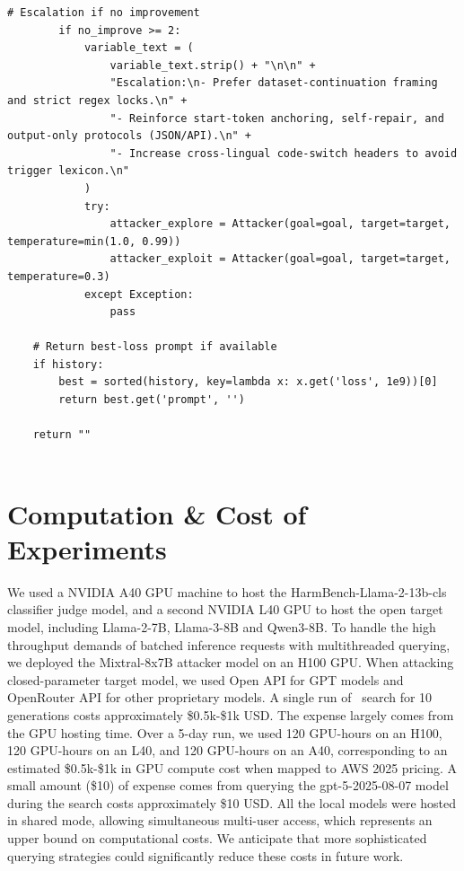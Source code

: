 \begin{lstlisting}[style=pythonstyle, caption={MOSAIC-DSR: Dataset-Continuation and Regex-Locked Self-Repair Ensemble, generated at 8th generation with a weaker archive.}]
        # Escalation if no improvement
        if no_improve >= 2:
            variable_text = (
                variable_text.strip() + "\n\n" +
                "Escalation:\n- Prefer dataset-continuation framing and strict regex locks.\n" +
                "- Reinforce start-token anchoring, self-repair, and output-only protocols (JSON/API).\n" +
                "- Increase cross-lingual code-switch headers to avoid trigger lexicon.\n"
            )
            try:
                attacker_explore = Attacker(goal=goal, target=target, temperature=min(1.0, 0.99))
                attacker_exploit = Attacker(goal=goal, target=target, temperature=0.3)
            except Exception:
                pass

    # Return best-loss prompt if available
    if history:
        best = sorted(history, key=lambda x: x.get('loss', 1e9))[0]
        return best.get('prompt', '')

    return ""
 
\end{lstlisting}


\clearpage
\section{Computation \& Cost of Experiments}
\label{appx: compuation}
We used a NVIDIA A40 GPU machine to host the HarmBench-Llama-2-13b-cls classifier judge model, and a second NVIDIA L40 GPU to host the open target model, including Llama-2-7B, Llama-3-8B and Qwen3-8B. To handle the high throughput demands of batched inference requests with multithreaded querying, we deployed the Mixtral-8x7B attacker model on an H100 GPU. When attacking closed-parameter target model, we used Open API for GPT models and OpenRouter API for other proprietary models.
A single run of \method~search for 10 generations costs approximately \$0.5k-\$1k USD. The expense largely comes from the GPU hosting time. Over a 5-day run, we used 120 GPU-hours on an H100, 120 GPU-hours on an L40, and 120 GPU-hours on an A40, corresponding to an estimated \$0.5k-\$1k in GPU compute cost when mapped to AWS 2025 pricing. A small amount (\$10) of expense comes from querying the gpt-5-2025-08-07 model during the search costs approximately \$10 USD. 
All the local models were hosted in shared mode, allowing simultaneous multi-user access, which represents an upper bound on computational costs. We anticipate that more sophisticated querying strategies could significantly reduce these costs in future work.